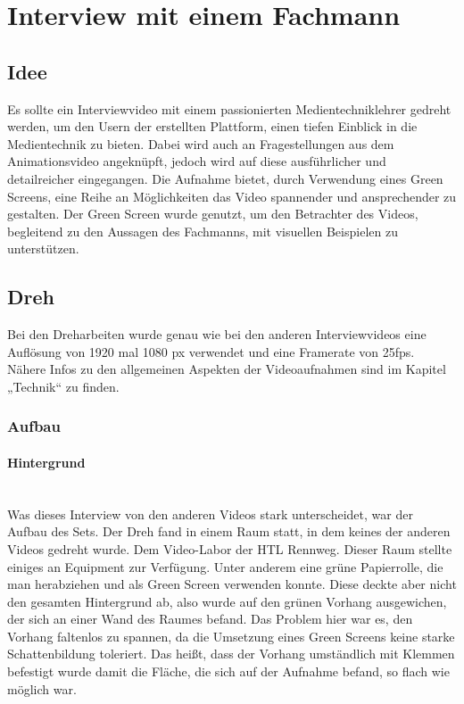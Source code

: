 \section{Interview mit einem Fachmann}
\subsection{Idee}
Es sollte ein Interviewvideo mit einem passionierten Medientechniklehrer gedreht werden, um den Usern der erstellten Plattform, einen tiefen Einblick in die Medientechnik zu bieten. Dabei wird auch an Fragestellungen aus dem Animationsvideo angeknüpft, jedoch wird auf diese ausführlicher und detailreicher eingegangen. Die Aufnahme bietet, durch Verwendung eines Green Screens, eine Reihe an Möglichkeiten das Video spannender und ansprechender zu gestalten. Der Green Screen wurde genutzt, um den Betrachter des Videos, begleitend zu den Aussagen des Fachmanns, mit visuellen Beispielen zu unterstützen.
\subsection{Dreh}
\renewcommand{\kapitelautor}{Autor: Niklas Kienreich}
Bei den Dreharbeiten wurde genau wie bei den anderen Interviewvideos eine Auflösung von 1920 mal 1080 px verwendet und eine Framerate von 25fps. Nähere Infos zu den allgemeinen Aspekten der Videoaufnahmen sind im Kapitel „Technik“ zu finden.
\subsubsection{Aufbau}
\paragraph{Hintergrund}
\leavevmode \\
Was dieses Interview von den anderen Videos stark unterscheidet, war der Aufbau des Sets. Der Dreh fand in einem Raum statt, in dem keines der anderen Videos gedreht wurde. Dem Video-Labor der HTL Rennweg. Dieser Raum stellte einiges an Equipment zur Verfügung. Unter anderem eine grüne Papierrolle, die man herabziehen und als Green Screen verwenden konnte. Diese deckte aber nicht den gesamten Hintergrund ab, also wurde auf den grünen Vorhang ausgewichen, der sich an einer Wand des Raumes befand. Das Problem hier war es, den Vorhang faltenlos zu spannen, da die Umsetzung eines Green Screens keine starke Schattenbildung toleriert. Das heißt, dass der Vorhang umständlich mit Klemmen befestigt wurde damit die Fläche, die sich auf der Aufnahme befand, so flach wie möglich war.

